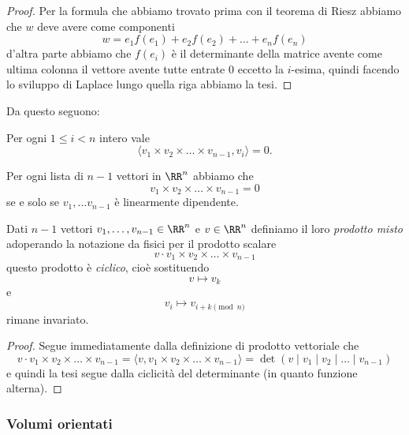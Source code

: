 \documentclass[11pt]{scrartcl}
\begin{document}
   	 \begin{proof}
   	 	Per la formula che abbiamo trovato prima con il teorema di Riesz abbiamo che $w$ deve avere come componenti 
   	 	$$w=e_1f(e_1)+e_2f(e_2)+\dots+e_nf(e_n)$$
   	 	d'altra parte abbiamo che $f(e_i)$ è il determinante della matrice avente come ultima colonna il vettore avente tutte entrate $0$ eccetto la $i$-esima, quindi facendo lo sviluppo di Laplace lungo quella riga abbiamo la tesi.
   	 \end{proof}
   	 Da questo seguono:
   	 \begin{corollary}
   	 	Per ogni $1\le i<n$ intero vale
   	 	$$\langle v_1\times v_2\times \dots\times v_{n-1},v_i\rangle =0.$$
   	 \end{corollary}
   	 \begin{corollary}
   	 	Per ogni lista di $n-1$ vettori in $\RR^n$ abbiamo che 
   	 	$$v_1\times v_2 \times \dots \times v_{n-1}=0$$
   	 	se e solo se $v_1,\dots v_{n-1}$ è linearmente dipendente.
   	 \end{corollary}
   	 \begin{corollary}
   	 	Dati $n-1$ vettori $v_1,\dots,v_{n-1}\in\RR^n$ e $v\in\RR^n$ definiamo il loro \textit{prodotto misto} adoperando la notazione da fisici per il prodotto scalare
   	 	$$v\cdot v_1\times v_2\times \dots \times v_{n-1}$$
   	 	questo prodotto è \textit{ciclico}, cioè sostituendo
   	 	$$v\mapsto v_k$$
   	 	e 
   	 	$$v_{i}\mapsto v_{i+k \pmod{ n}}$$
   	 	rimane invariato.
   	 \end{corollary}
   	 \begin{proof}
   	 	Segue immediatamente dalla definizione di prodotto vettoriale che
   	 	$$v\cdot v_1\times v_2\times \dots \times v_{n-1}=\langle v,v_1\times v_2\times \dots \times v_{n-1}\rangle =\det\left(v\mid v_1\mid v_2 \mid \dots \mid v_{n-1} \right)$$
   	 	e quindi la tesi segue dalla ciclicità del determinante (in quanto funzione alterna).
   	 \end{proof}
   	 \subsubsection{Volumi orientati}
   	 
\end{document}
